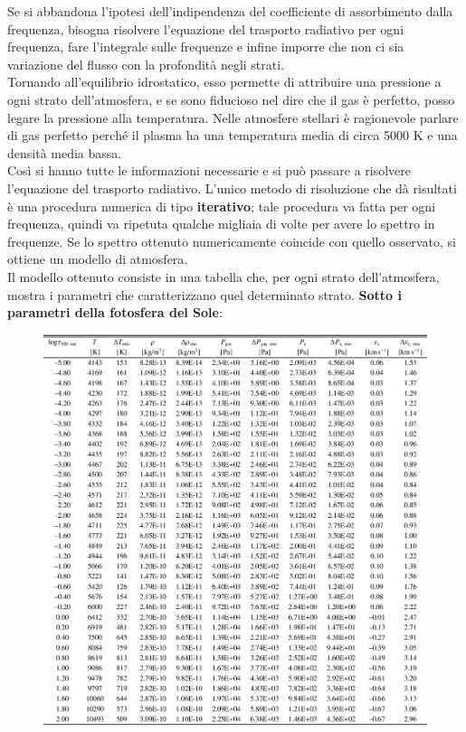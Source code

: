 \documentclass[a4paper,11pt]{article}
\begin{document}
Se si abbandona l'ipotesi dell'indipendenza del coefficiente di assorbimento dalla frequenza, bisogna risolvere l'equazione del trasporto radiativo per ogni frequenza, fare l'integrale sulle frequenze e infine imporre che non ci sia variazione del flusso con la profondità negli strati.\\
Tornando all'equilibrio idrostatico, esso permette di attribuire una pressione a ogni strato dell'atmosfera, e se sono fiducioso nel dire che il gas è perfetto, posso legare la pressione alla temperatura. Nelle atmosfere stellari è ragionevole parlare di gas perfetto perché il plasma ha una temperatura media di circa 5000 K e una densità media bassa.\\ 
Così si hanno tutte le informazioni necessarie e si può passare a risolvere l'equazione del trasporto radiativo. L'unico metodo di risoluzione che dà risultati è una procedura numerica di tipo \textbf{iterativo}; tale procedura va fatta per ogni frequenza, quindi va ripetuta qualche migliaia di volte per avere lo spettro in frequenze. Se lo spettro ottenuto numericamente coincide con quello osservato, si ottiene un modello di atmosfera. \\
Il modello ottenuto consiste in una tabella che, per ogni strato dell'atmosfera, mostra i parametri che caratterizzano quel determinato strato. \textbf{Sotto i parametri della fotosfera del Sole}:

\begin{figure}[h]
    \centering
    \includegraphics{Tabella atmosfera.png}
\end{figure}
\end{document}
